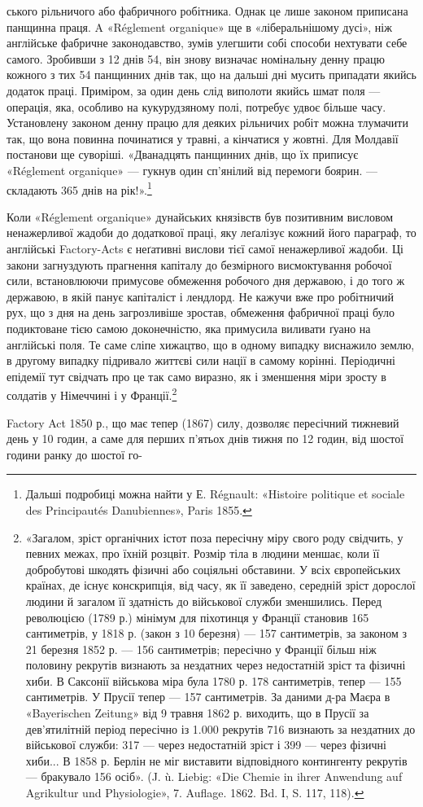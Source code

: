ського рільничого або фабричного робітника. Однак це лише
законом приписана панщинна праця. A «Réglement organique»
ще в «ліберальнішому дусі», ніж англійське фабричне законодавство,
зумів улегшити собі способи нехтувати себе самого.
Зробивши з 12 днів 54, він знову визначає номінальну денну працю
кожного з тих 54 панщинних днів так, що на дальші дні мусить
припадати якийсь додаток праці. Приміром, за один день слід
виполоти якийсь шмат поля — операція, яка, особливо на кукурудзяному
полі, потребує удвоє більше часу. Установлену законом
денну працю для деяких рільничих робіт можна тлумачити
так, що вона повинна починатися у травні, а кінчатися у жовтні.
Для Молдавії постанови ще суворіші. «Дванадцять панщинних
днів, що їх приписує «Réglement organique» — гукнув один
сп’янілий від перемоги боярин. — складають 365 днів на рік!».\footnote{
Дальші подробиці можна найти у Е. Régnault: «Histoire politique
et sociale des Principautés Danubiennes», Paris 1855.
}

Коли «Réglement organique» дунайських князівств був позитивним
висловом ненажерливої жадоби до додаткової праці, яку
леґалізує кожний його параграф, то англійські Factory-Acts
є неґативні вислови тієї самої ненажерливої жадоби. Ці закони
загнуздують прагнення капіталу до безмірного висмоктування
робочої сили, встановлюючи примусове обмеження робочого дня
державою, і до того ж державою, в якій панує капіталіст і лендлорд.
Не кажучи вже про робітничий рух, що з дня на день загрозливіше
зростав, обмеження фабричної праці було подиктоване
тією самою доконечністю, яка примусила виливати ґуано
на англійські поля. Те саме сліпе хижацтво, що в одному випадку
виснажило землю, в другому випадку підривало життєві сили
нації в самому корінні. Періодичні епідемії тут свідчать про це
так само виразно, як і зменшення міри зросту в солдатів у Німеччині
і у Франції.\footnote{
«Загалом, зріст органічних істот поза пересічну міру свого роду
свідчить, у певних межах, про їхній розцвіт. Розмір тіла в людини меншає,
коли її добробутові шкодять фізичні або соціяльні обставини. У всіх європейських
країнах, де існує конскрипція, від часу, як її заведено, середній
зріст дорослої людини й загалом її здатність до військової служби зменшились.
Перед революцією (1789 р.) мінімум для піхотинця у Франції
становив 165 сантиметрів, у 1818 р. (закон з 10 березня) — 157 сантиметрів,
за законом з 21 березня 1852 р. — 156 сантиметрів; пересічно у Франції
більш ніж половину рекрутів визнають за нездатних через недостатній
зріст та фізичні хиби. В Саксонії військова міра була 1780 р. 178 сантиметрів,
тепер — 155 сантиметрів. У Прусії тепер — 157 сантиметрів. За даними
д-ра Маєра в «Bayerischen Zeitung» від 9 травня 1862 р. виходить,
що в Прусії за дев’ятилітній період пересічно із 1.000 рекрутів 716 визнають
за нездатних до військової служби: 317 — через недостатній зріст і
399 — через фізичні хиби... В 1858 р. Берлін не міг виставити відповідного
контингенту рекрутів — бракувало 156 осіб». (J. ù. Liebig: «Die
Chemie in ihrer Anwendung auf Agrikultur und Physiologie», 7. Auflage.
1862. Bd. I, S. 117, 118).
}

Factory Act 1850 р., що має тепер (1867) силу, дозволяє пересічний
тижневий день у 10 годин, а саме для перших п’ятьох
днів тижня по 12 годин, від шостої години ранку до шостої го-